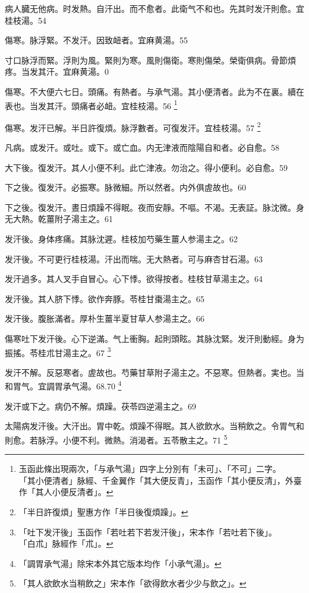 \documentclass[b5paper,twoside,zihao=-4,UTF8]{ctexbook}
\begin{document}
病人臓无他病。时发熱。自汗出。而不愈者。此衛气不和也。先其时发汗則愈。宜桂枝湯。54

傷寒。脉浮緊。不发汗。因致衄者。宜麻黄湯。55

{寸口}脉浮而緊。浮則为風。緊則为寒。風則傷衛。寒則傷榮。榮衛俱病。骨節煩疼。当发其汗。宜麻黄湯。0

傷寒。不大便六七日。頭痛。有熱者。与承气湯。其小便清者。此为不在裏。續在表也。当发其汗。頭痛者必衄。宜桂枝湯。56
	\footnote{玉函此條出現兩次，「与承气湯」四字上分別有「未可」、「不可」二字。\\「其小便清者」脉經、千金翼作「其大便反青」，玉函作「其小便反清」，外臺作「其人小便反清者」。}

傷寒。发汗已解。半日許復煩。脉浮數者。可復发汗。宜桂枝湯。57
	\footnote{「半日許復煩」聖惠方作「半日後復煩躁」。}

凡病。或发汗。或吐。或下。或亡血。{内}无津液而陰陽自和者。必自愈。58

大下後。復发汗。其人小便不利。此亡津液。勿治之。得小便利。必自愈。59

下之後。復发汗。必振寒。脉微細。所以然者。内外俱虗故也。60

下之後。復发汗。晝日煩躁不得眠。夜而安靜。不嘔。不渴。无表証。脉沈微。身无大熱。乾薑附子湯主之。61

发汗後。身体疼痛。其脉沈遲。桂枝加芍藥生薑人参湯主之。62

发汗後。{不可更行桂枝湯。}汗出而喘。无大熱者。可与麻杏甘石湯。63

发汗過多。其人叉手自冒心。心下悸。欲得按者。桂枝甘草湯主之。64

发汗後。其人脐下悸。欲作奔豚。苓桂甘棗湯主之。65

发汗後。腹胀滿者。厚朴{生薑半夏甘草人参}湯主之。66

傷寒吐下发汗後。心下逆滿。气上衝胸。起則頭眩。其脉沈緊。发汗則動經。身为振搖。苓桂朮甘湯主之。67
	\footnote{「吐下发汗後」玉函作「若吐若下若发汗後」，宋本作「若吐若下後」。\\「白朮」脉經作「朮」。}

发汗不解。反惡寒者。虗故也。芍藥甘草附子湯主之。不惡寒。但熱者。実也。当和胃气。宜調胃承气湯。68.70
	\footnote{「調胃承气湯」除宋本外其它版本均作「小承气湯」。}

发汗或下之。{病仍}不解。煩躁。茯苓四逆湯主之。69

太陽病发汗後。大汗出。胃中乾。煩躁不得眠。其人欲飲水。当稍飲之。令胃气和則愈。若脉浮。小便不利。微熱。消渴者。五苓散主之。71
	\footnote{「其人欲飲水当稍飲之」宋本作「欲得飲水者少少与飲之」。}
\end{document}
